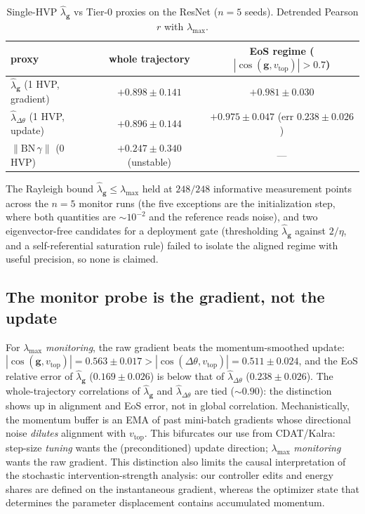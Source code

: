\documentclass{article}
\theoremstyle{plain}
\theoremstyle{definition}
\theoremstyle{remark}
\newcommand{\lmax}{\lambda_{\max}}
\newcommand{\lhatg}{\hat{\lambda}_{\mathbf{g}}}
\newcommand{\lhatd}{\hat{\lambda}_{\Delta\theta}}
\newcommand{\RTableTopGap}{%
  \setlength{\abovetopsep}{2pt}%
}
\begin{document}
\begin{table}[!ht]
\centering\small
\caption{Single-HVP $\lhatg$ vs Tier-0 proxies on the ResNet ($n=5$ seeds).
Detrended Pearson $r$ with $\lmax$.}
\label{tab:proxy}
{\renewcommand{\arraystretch}{1.10}\RTableTopGap
\begin{tabular}{lcc}
\toprule
proxy & whole trajectory & EoS regime ($|\cos(\mathbf{g},v_{\mathrm{top}})|>0.7$) \\
\midrule
$\lhatg$ (1 HVP, gradient)      & $\mathbf{+0.898\!\pm\!0.141}$ & $\mathbf{+0.981\!\pm\!0.030}$ \\
$\lhatd$ (1 HVP, update)        & $+0.896\!\pm\!0.144$          & $+0.975\!\pm\!0.047$ (err $0.238\!\pm\!0.026$) \\
$\|\mathrm{BN}\,\gamma\|$ (0 HVP) & $+0.247\!\pm\!0.340$ (unstable) & --- \\
\bottomrule
\end{tabular}}
\end{table}

The Rayleigh bound $\lhatg\leq\lmax$ held at $248/248$ informative
measurement points across the $n{=}5$ monitor runs (the five exceptions
are the initialization step, where both quantities are ${\sim}10^{-2}$
and the reference reads noise), and two eigenvector-free candidates for a
deployment gate (thresholding $\lhatg$ against $2/\eta$, and a
self-referential saturation rule) failed to isolate the aligned regime
with useful precision, so none is claimed.


\subsection{The monitor probe is the gradient, not the update}
\label{sec:gvstd}
For $\lmax$ \emph{monitoring}, the raw gradient beats the momentum-smoothed
update: $|\cos(\mathbf{g},v_{\mathrm{top}})|=0.563\!\pm\!0.017 >
|\cos(\Delta\theta,v_{\mathrm{top}})|=0.511\!\pm\!0.024$,
and the EoS relative error of $\lhatg$ ($0.169\!\pm\!0.026$) is below that of
$\lhatd$ ($0.238\!\pm\!0.026$). The whole-trajectory
correlations of $\lhatg$ and $\lhatd$ are tied ($\sim\!0.90$): the distinction
shows up in alignment and EoS error, not in global correlation. Mechanistically,
the momentum buffer is an EMA of past mini-batch gradients whose directional
noise \emph{dilutes} alignment with $v_{\mathrm{top}}$. This bifurcates our use
from CDAT/Kalra: step-size \emph{tuning} wants the (preconditioned) update
direction; $\lmax$ \emph{monitoring} wants the raw gradient. This
distinction also limits the causal interpretation of the stochastic
intervention-strength analysis: our controller edits and energy
shares are defined on the instantaneous gradient, whereas the
optimizer state that determines the parameter displacement contains
accumulated momentum.
\end{document}

